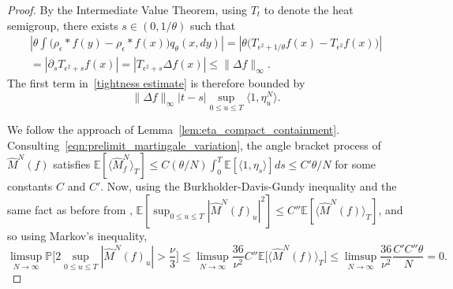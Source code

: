 \documentclass[EJP]{ejpecp} %
\newcommand{\IP}{\mathbb P}
\newcommand{\IE}{\mathbb E}
\newcommand{\comment}[1]{{\color{blue} \it #1}}
\newcommand{\citet}[1]{\cite{#1}}
\begin{document}
\begin{proof}
By the Intermediate Value Theorem, using $T_t$ to denote the heat semigroup,
there exists $s\in (0,1/\theta)$ such that
\begin{multline*}
\left|
\theta\int\big(\rho_\epsilon*f(y)-\rho_\epsilon*f(x)\big)
q_{\theta}(x,dy) \right|
=
\left|\theta\Big(T_{\epsilon^2+1/\theta}f(x)-T_{\epsilon^2}f(x)\Big)\right|
\\
=
\left|\partial_sT_{\epsilon^2+s}f(x)\right|=\left|T_{\epsilon^2+s}\Delta f(x)\right|
\leq\|\Delta f\|_\infty.
\end{multline*}
The first term in~\eqref{tightness estimate} is therefore bounded by
$$
    \| \Delta f \|_\infty |t-s| \sup_{0 \leq u \leq T } \langle 1, \eta_u^N \rangle .
$$

We follow the approach of Lemma~\ref{lem:eta_compact_containment}.
Consulting~\eqref{eqn:prelimit_martingale_variation},
the angle bracket process of $\widehat{M}^N(f)$ satisfies
$ \IE[\langle\widehat{M}^N_f\rangle_T] \le C (\theta/N) \int_0^T \IE[\langle 1, \eta_s \rangle] ds \le C' \theta/N$
for some constants $C$ and $C'$.
Now, using the Burkholder-Davis-Gundy inequality
and the same fact as before from \citet{barlow/jacka/yor:1986}, 
$\IE[\sup_{0 \le u \le T} |\widehat{M}^N(f)_u|^2] \le C'' \IE[\langle\widehat{M}^N(f)\rangle_T]$,
and so using Markov's inequality,
\begin{equation}
\label{martingale term to zero}
    \limsup_{N\to\infty}\IP\Big[
        2\sup_{0\leq u\leq T}|\widehat{M}^N(f)_u|
        >\frac{\nu}{3}
    \Big]
    \leq
    \limsup_{N\to\infty} \frac{36}{\nu^2} C'' \IE\big[\langle\widehat{M}^N(f)\rangle_T\big]
    \leq
    \limsup_{N\to\infty}\frac{36}{\nu^2}\frac{C' C''\theta}{N}
    = 0 .
\end{equation}



\end{proof}
\end{document}
